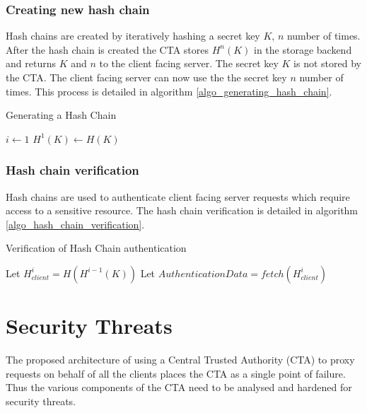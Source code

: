 \documentclass{sig-alternate-05-2015}
\begin{document}
\subsubsection*{Creating new hash chain}
Hash chains are created by iteratively hashing a secret key $K$, $n$ number of times. 
After the hash chain is created the CTA stores $H^{n}(K)$ in the storage backend and returns $K$ and $n$ to the client facing server. The secret key $K$ is not stored by the CTA. The client facing server can now use the the secret key $n$ number of times. This process is detailed in algorithm  \ref{algo_generating_hash_chain}.

\begin{algorithm}
\SetAlgoLined
\caption{Generating a Hash Chain}
\label{algo_generating_hash_chain}
\LinesNumbered
{}
$i \leftarrow 1 $\;
$H^{1}(K) \leftarrow H(K)$ \;
 \;
\end{algorithm}
\subsubsection*{Hash chain verification}
Hash chains are used to authenticate client facing server requests which require access to a sensitive resource. The hash chain verification is detailed in algorithm \ref{algo_hash_chain_verification}.

\begin{algorithm}
\label{algo_hash_chain_verification}
\SetAlgoLined
\caption{Verification of Hash Chain authentication}
\LinesNumbered
{}
	Let $H_{client}^{i} = H(H^{i-1}(K))$ \;
	Let $AuthenticationData = fetch(H_{client}^{i})$ \;
	
\end{algorithm}


\section*{Security Threats}

The proposed architecture of using a Central Trusted Authority (CTA) to proxy requests on behalf of all the clients places the CTA as a single point of failure. Thus the various components of the CTA need to be analysed and hardened for security threats. 
\end{document}

